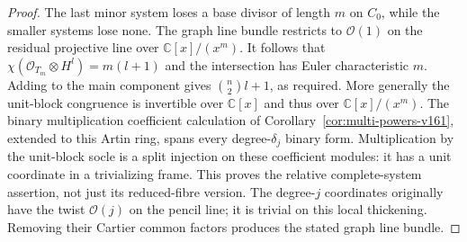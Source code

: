 \documentclass[11pt,reqno]{amsart}
\numberwithin{equation}{section}
\theoremstyle{definition}\newtheorem{definition}[theorem]{Definition}
\theoremstyle{remark}\newtheorem{remark}[theorem]{Remark}
\newcommand{\C}{\mathbb C}\newcommand{\Q}{\mathbb Q}
\newcommand{\OO}{\mathcal O}\newcommand{\II}{\mathcal I}
\begin{document}
\begin{proof}
The last minor system loses a base divisor of length $m$ on $C_0$,
while the smaller systems lose none. The graph line bundle restricts
to $\OO(1)$ on the residual projective line over $\C[x]/(x^m)$.
It follows that $\chi(\OO_{T_m}\otimes H^l)=m(l+1)$ and the
intersection has Euler characteristic $m$. Adding to the main
component gives $\binom n2l+1$, as required. More generally the
unit-block congruence is invertible over $\C[x]$ and thus over
$\C[x]/(x^m)$. The binary multiplication coefficient calculation of
Corollary~\ref{cor:multi-powers-v161}, extended to this Artin ring,
spans every degree-$\delta_j$ binary form. Multiplication by the
unit-block socle is a split injection on these coefficient modules:
it has a unit coordinate in a trivializing frame. This proves the
relative complete-system assertion, not just its reduced-fibre version.
The degree-$j$ coordinates originally have the twist $\OO(j)$ on
the pencil line; it is trivial on this local thickening. Removing
their Cartier common factors produces the stated graph line bundle.
\end{proof}
\end{document}
